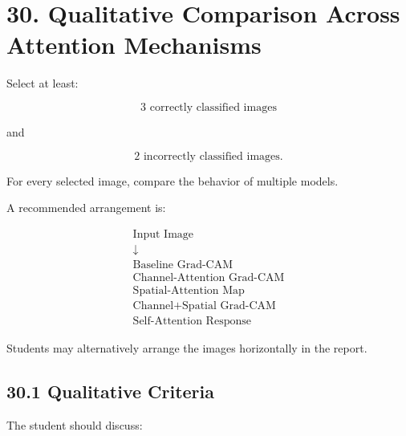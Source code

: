 \documentclass[10pt]{article}
\begin{document}
\section*{30. Qualitative Comparison Across Attention Mechanisms}

Select at least:

\[
\boxed{
3\text{ correctly classified images}
}
\]

and

\[
\boxed{
2\text{ incorrectly classified images}.
}
\]

For every selected image, compare the behavior of multiple models.

A recommended arrangement is:

\[
\boxed{
\begin{array}{c}
\text{Input Image}\\
\downarrow\\
\text{Baseline Grad-CAM}\\
\text{Channel-Attention Grad-CAM}\\
\text{Spatial-Attention Map}\\
\text{Channel+Spatial Grad-CAM}\\
\text{Self-Attention Response}
\end{array}
}
\]

Students may alternatively arrange the images horizontally in the report.

\subsection*{30.1 Qualitative Criteria}

The student should discuss:
\end{document}
